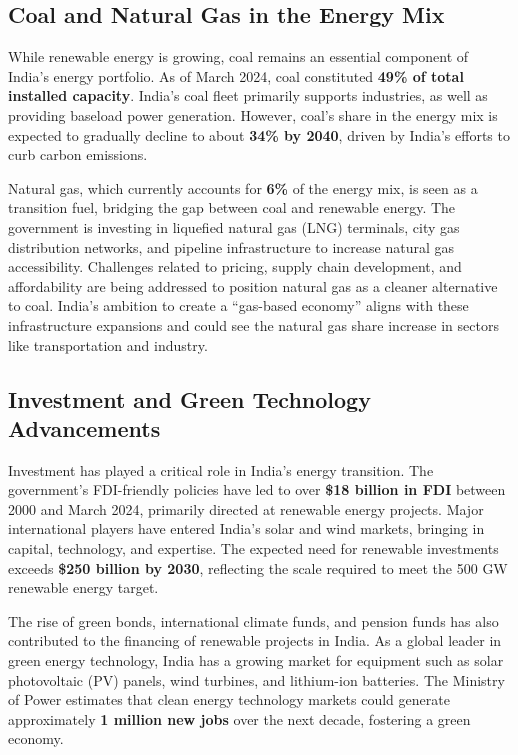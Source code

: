 \documentclass[12pt]{article}
\begin{document}
\begin{spacing}{1.5}
\subsection*{Coal and Natural Gas in the Energy Mix}
While renewable energy is growing, coal remains an essential component of India’s energy portfolio. As of March 2024, coal constituted \textbf{49\% of total installed capacity}. India’s coal fleet primarily supports industries, as well as providing baseload power generation. However, coal’s share in the energy mix is expected to gradually decline to about \textbf{34\% by 2040}, driven by India's efforts to curb carbon emissions.

Natural gas, which currently accounts for \textbf{6\%} of the energy mix, is seen as a transition fuel, bridging the gap between coal and renewable energy. The government is investing in liquefied natural gas (LNG) terminals, city gas distribution networks, and pipeline infrastructure to increase natural gas accessibility. Challenges related to pricing, supply chain development, and affordability are being addressed to position natural gas as a cleaner alternative to coal. India’s ambition to create a “gas-based economy” aligns with these infrastructure expansions and could see the natural gas share increase in sectors like transportation and industry.

\subsection*{Investment and Green Technology Advancements}
Investment has played a critical role in India’s energy transition. The government’s FDI-friendly policies have led to over \textbf{\$18 billion in FDI} between 2000 and March 2024, primarily directed at renewable energy projects. Major international players have entered India’s solar and wind markets, bringing in capital, technology, and expertise. The expected need for renewable investments exceeds \textbf{\$250 billion by 2030}, reflecting the scale required to meet the 500 GW renewable energy target.

The rise of green bonds, international climate funds, and pension funds has also contributed to the financing of renewable projects in India. As a global leader in green energy technology, India has a growing market for equipment such as solar photovoltaic (PV) panels, wind turbines, and lithium-ion batteries. The Ministry of Power estimates that clean energy technology markets could generate approximately \textbf{1 million new jobs} over the next decade, fostering a green economy.


\end{spacing}
\end{document}
